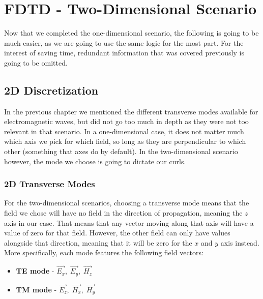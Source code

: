 
\chapter{FDTD - Two-Dimensional Scenario} %

\label{Chapter3} %


Now that we completed the one-dimensional scenario, the following is going to be much easier, as we are going to use the same logic for the most part. For the interest of saving time, redundant information that was covered previously is going to be omitted.

\section{2D Discretization}

In the previous chapter we mentioned the different transverse modes available for electromagnetic waves, but did not go too much in depth as they were not too relevant in that scenario. In a one-dimensional case, it does not matter much which axis we pick for which field, so long as they are perpendicular to which other (something that axes do by default). In the two-dimensional scenario however, the mode we choose is going to dictate our curls. 

\subsection{2D Transverse Modes}

For the two-dimensional scenarios, choosing a transverse mode means that the field we chose will have no field in the direction of propagation, meaning the $z$ axis in our case. That means that any vector moving along that axis will have a value of zero for that field. However, the other field can only have values alongside that direction, meaning that it will be zero for the $x$ and $y$ axis instead. More specifically, each mode features the following field vectors:

\begin{itemize}
	\item \textbf{TE mode} - \space $\vec{E_x},\; \vec{E_y},\; \vec{H_z}$
	\item \textbf{TM mode} - \space $\vec{E_z},\; \vec{H_x},\; \vec{H_y}$
\end{itemize}

